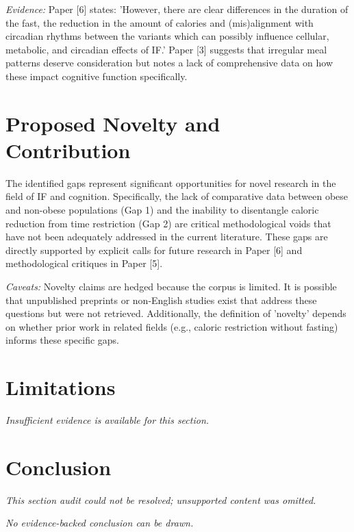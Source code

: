 \documentclass[11pt]{article}
\begin{document}
\textit{Evidence:} Paper [6] states: 'However, there are clear differences in the duration of the fast, the reduction in the amount of calories and (mis)alignment with circadian rhythms between the variants which can possibly influence cellular, metabolic, and circadian effects of IF.' Paper [3] suggests that irregular meal patterns deserve consideration but notes a lack of comprehensive data on how these impact cognitive function specifically.

\section{Proposed Novelty and Contribution}
The identified gaps represent significant opportunities for novel research in the field of IF and cognition. Specifically, the lack of comparative data between obese and non-obese populations (Gap 1) and the inability to disentangle caloric reduction from time restriction (Gap 2) are critical methodological voids that have not been adequately addressed in the current literature. These gaps are directly supported by explicit calls for future research in Paper [6] and methodological critiques in Paper [5].

\textit{Caveats:} Novelty claims are hedged because the corpus is limited. It is possible that unpublished preprints or non-English studies exist that address these questions but were not retrieved. Additionally, the definition of 'novelty' depends on whether prior work in related fields (e.g., caloric restriction without fasting) informs these specific gaps.

\section{Limitations}
\textit{Insufficient evidence is available for this section.}

\section{Conclusion}
\textit{This section audit could not be resolved; unsupported content was omitted.}

\textit{No evidence-backed conclusion can be drawn.}
\end{document}
